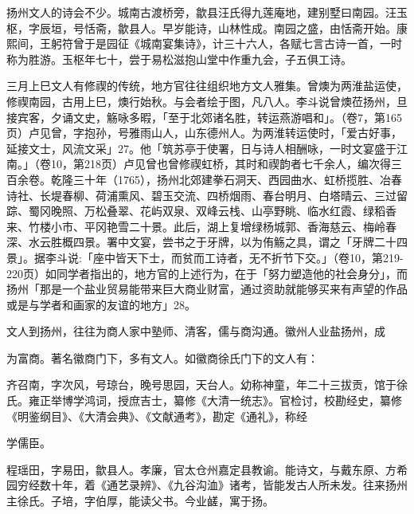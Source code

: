 扬州文人的诗会不少。城南古渡桥旁，歙县汪氏得九莲庵地，建别墅曰南园。汪玉枢，字辰垣，号恬斋，歙县人。早岁能诗，山林性成。南园之盛，由恬斋开始。康熙间，王躬符曾于是园征《城南宴集诗》，计三十六人，各赋七言古诗一首，一时称为胜游。玉枢年七十，尝于易松滋抱山堂中作重九会，子五俱工诗。

三月上巳文人有修禊的传统，地方官往往组织地方文人雅集。曾燠为两淮盐运使，修禊南园，古用上巳，燠行始秋。与会者绘于图，凡八人。李斗说曾燠莅扬州，旦接宾客，夕诵文史，觞咏多暇，「至于北郊诸名胜，转运燕游唱和」。（卷7，第165页）卢见曾，字抱孙，号雅雨山人，山东德州人。为两淮转运使时，「爱古好事，延接文士，风流文采」27。他「筑苏亭于使署，日与诗人相酬咏，一时文宴盛于江南。」（卷10，第218页）卢见曾也曾修禊虹桥，其时和禊韵者七千余人，编次得三百余卷。乾隆三十年（1765），扬州北郊建拳石洞天、西园曲水、虹桥揽胜、冶春诗社、长堤春柳、荷浦熏风、碧玉交流、四桥烟雨、春台明月、白塔晴云、三过留踪、蜀冈晚照、万松叠翠、花屿双泉、双峰云栈、山亭野眺、临水红霞、绿稻香来、竹楼小市、平冈艳雪二十景。此后，湖上复增绿杨城郭、香海慈云、梅岭春深、水云胜概四景。署中文宴，尝书之于牙牌，以为侑觞之具，谓之「牙牌二十四景」。据李斗说:「座中皆天下士，而贫而工诗者，无不折节下交。」（卷10，第219-220页）如同学者指出的，地方官的上述行为，在于「努力塑造他的社会身分」，而扬州「那是一个盐业贸易能带来巨大商业财富，通过资助就能够买来有声望的作品或是与学者和画家的友谊的地方」28。

文人到扬州，往往为商人家中塾师、清客，儒与商沟通。徽州人业盐扬州，成

\vfill
\begin{BookNotes}
\end{BookNotes}

\noindent 为富商。著名徽商门下，多有文人。如徽商徐氏门下的文人有：

\begin{BookQuote}
齐召南，字次风，号琼台，晚号思园，天台人。幼称神童，年二十三拔贡，馆于徐氏。雍正举博学鸿词，授庶吉士，纂修《大清一统志》。官检讨，校勘经史，纂修《明鉴纲目》、《大清会典》、《文献通考》，勘定《通礼》，称经
\end{BookQuote}

学儒臣。

\begin{BookQuote}
程瑶田，字易田，歙县人。孝廉，官太仓州嘉定县教谕。能诗文，与戴东原、方希园穷经数十年，着《通艺录辨》、《九谷沟洫》诸考，皆能发古人所未发。往来扬州主徐氏。子培，字伯厚，能读父书。今业鹾，寓于扬。
\end{BookQuote}

